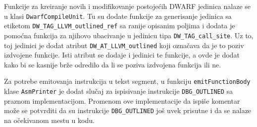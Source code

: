 \documentclass[12pt,oneside]{memoir}
\begin{document}
Funkcije za kreiranje novih i modifikovanje postojećih DWARF jedinica nalaze se u klasi \verb|DwarfCompileUnit|.
Tu su dodate funkcije za generisanje jedinica sa etiketom \verb|DW_TAG_LLVM_outlined_ref| sa ranije opisanim poljima i dodata je pomoćna funkcija za njihovo ubacivanje u jedinicu tipa \verb|DW_TAG_call_site|.
Uz to, toj jedinici je dodat atribut \verb|DW_AT_LLVM_outlined| koji označava da je to poziv izdvojene funkcije.
Isti atribut se dodaje i jedinici te funkcije, a ovde je dodat kako bi se kasnije brže odredilo da li se poziva izdvojena funkcija ili ne.

Za potrebe emitovanja instrukcija u tekst segment, u funkciju \verb|emitFunctionBody| klase \verb|AsmPrinter| je dodat slučaj za ispisivanje instrukcije \verb|DBG_OUTLINED| sa praznom implementacijom.
Promenom ove implementacije da ispiše komentar može se potvrditi da su instrukcije \verb|DBG_OUTLINED| još uvek prisutne i da se nalaze na očekivanom mestu u kodu.
\end{document}
